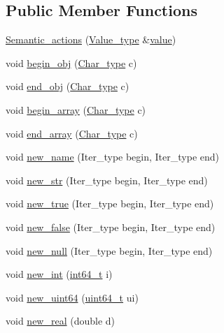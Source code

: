 \subsection*{Public Member Functions}
\begin{DoxyCompactItemize}
\item 
\hyperlink{classjson__spirit_1_1_semantic__actions_aaeb9ae90699d93df7df131869b0197c4}{Semantic\+\_\+actions} (\hyperlink{namespacejson__spirit_aeaad57c912e0370a76f60cd510ad3d74}{Value\+\_\+type} \&\hyperlink{cache_8cc_a0f61d63b009d0880a89c843bd50d8d76}{value})
\item 
void \hyperlink{classjson__spirit_1_1_semantic__actions_a0251d562d65e23a82dab0aa9369998e7}{begin\+\_\+obj} (\hyperlink{classjson__spirit_1_1_semantic__actions_a14acf53ba844eb982d4e109687e501d2}{Char\+\_\+type} c)
\item 
void \hyperlink{classjson__spirit_1_1_semantic__actions_ab2333783011c8ef1dc2d52ec7deb1741}{end\+\_\+obj} (\hyperlink{classjson__spirit_1_1_semantic__actions_a14acf53ba844eb982d4e109687e501d2}{Char\+\_\+type} c)
\item 
void \hyperlink{classjson__spirit_1_1_semantic__actions_ad6c80cc8dbfd3d5703e2c5e735b613e3}{begin\+\_\+array} (\hyperlink{classjson__spirit_1_1_semantic__actions_a14acf53ba844eb982d4e109687e501d2}{Char\+\_\+type} c)
\item 
void \hyperlink{classjson__spirit_1_1_semantic__actions_a319bd1d44ad84d9189c78bae81f45a0d}{end\+\_\+array} (\hyperlink{classjson__spirit_1_1_semantic__actions_a14acf53ba844eb982d4e109687e501d2}{Char\+\_\+type} c)
\item 
void \hyperlink{classjson__spirit_1_1_semantic__actions_a06666c4c4e32ecf199e2da97dcf2fea9}{new\+\_\+name} (Iter\+\_\+type begin, Iter\+\_\+type end)
\item 
void \hyperlink{classjson__spirit_1_1_semantic__actions_ab2e19f4b24c44c0d611ecdc3decc3329}{new\+\_\+str} (Iter\+\_\+type begin, Iter\+\_\+type end)
\item 
void \hyperlink{classjson__spirit_1_1_semantic__actions_a6b4d7706a43d403e17fd554d6c113370}{new\+\_\+true} (Iter\+\_\+type begin, Iter\+\_\+type end)
\item 
void \hyperlink{classjson__spirit_1_1_semantic__actions_a0d5daa61c6d67f23a52150f9c3760ef8}{new\+\_\+false} (Iter\+\_\+type begin, Iter\+\_\+type end)
\item 
void \hyperlink{classjson__spirit_1_1_semantic__actions_aefab8e13244629e0a01d0c65be075269}{new\+\_\+null} (Iter\+\_\+type begin, Iter\+\_\+type end)
\item 
void \hyperlink{classjson__spirit_1_1_semantic__actions_a5ff004592b45d14648c96af0e64a83e6}{new\+\_\+int} (\hyperlink{stdint_8h_adec1df1b8b51cb32b77e5b86fff46471}{int64\+\_\+t} i)
\item 
void \hyperlink{classjson__spirit_1_1_semantic__actions_a28b6759e6cb7fd662bd70c557600ccaf}{new\+\_\+uint64} (\hyperlink{stdint_8h_aaa5d1cd013383c889537491c3cfd9aad}{uint64\+\_\+t} ui)
\item 
void \hyperlink{classjson__spirit_1_1_semantic__actions_a9408c0e40cb12d465228be617ff1ac28}{new\+\_\+real} (double d)
\end{DoxyCompactItemize}


